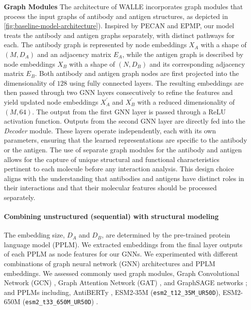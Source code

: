 \documentclass[11pt]{article}
\begin{document}

\textbf{Graph Modules} The architecture of WALLE incorporates graph modules that process the input graphs of antibody and antigen structures, as depicted in \cref{fig:baseline-model-architecture}). 
Inspired by PECAN and EPMP, our model treats the antibody and antigen graphs separately, with distinct pathways for each.
The antibody graph is represented by node embeddings $ X_A $ with a shape of $ (M, D_A) $ and an adjacency matrix $ E_A $, while the antigen graph is described by node embeddings $ X_B $ with a shape of $ (N, D_B) $ and its corresponding adjacency matrix $ E_B $. 
Both antibody and antigen graph nodes are first projected into the dimensionality of $ 128 $ using fully connected layers.
The resulting embeddings are then passed through two GNN layers consecutively to refine the features and yield updated node embeddings $ X_A^\prime $ and $X_B^\prime$ with a reduced dimensionality of $ (M, 64) $.
The output from the first GNN layer is passed through a ReLU activation function.
Outputs from the second GNN layer are directly fed into the \textit{Decoder} module.
These layers operate independently, each with its own parameters, ensuring that the learned representations are specific to the antibody or the antigen.
The use of separate graph modules for the antibody and antigen allows for the capture of unique structural and functional characteristics pertinent to each molecule before any interaction analysis.
This design choice aligns with the understanding that antibodies and antigens have distinct roles in their interactions and that their molecular features should be processed separately. 

\paragraph{Combining unstructured (sequential) with structural modeling} The embedding size, $ D_A $ and $ D_B $, are determined by the pre-trained protein language model (PPLM). 
We extracted embeddings from the final layer outputs of each PPLM as node features for our GNNs. 
We experimented with different combinations of graph neural network (GNN) architectures and PPLM embeddings. 
We assessed commonly used graph modules, Graph Convolutional Network (GCN) \citep{gcn}, Graph Attention Network (GAT) \citep{gat}, and GraphSAGE networks \citep{graphsage};
and PPLMs including, AntiBERTy \citep{antiberty}, ESM2-35M (\texttt{esm2\_t12\_35M\_UR50D}), ESM2-650M (\texttt{esm2\_t33\_650M\_UR50D}) \citep{ESM2}. 
\end{document}
